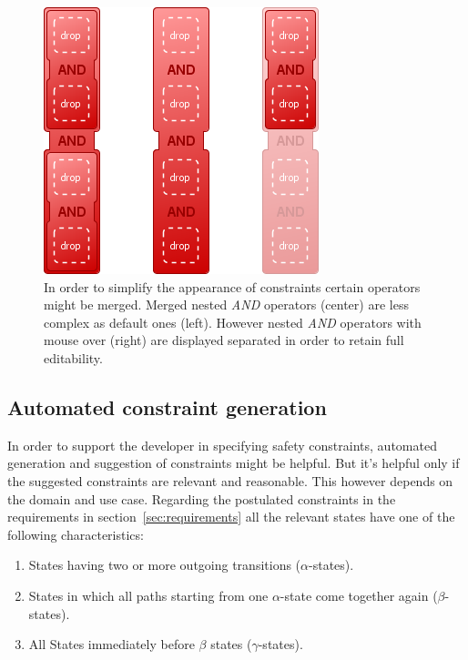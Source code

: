 \documentclass[conference]{IEEEtran}
\begin{document}
\begin{figure}[htbp]
  \centering
  \includegraphics[scale=0.5]{and_simplify} %
  \caption{In order to simplify the appearance of constraints certain operators might be merged. Merged nested \emph{AND} operators (center) are less complex as default ones (left). However nested \emph{AND} operators with mouse over (right) are displayed separated in order to retain full editability.}
  \label{fig:nested_and}
\end{figure}









\subsection{Automated constraint generation}
\label{sec:automatedconstraintgeneration}

In order to support the developer in specifying safety constraints, automated generation and suggestion of constraints might be helpful. But it's helpful only if the suggested constraints are relevant and reasonable. This however depends on the domain and use case.
Regarding the postulated constraints in the requirements in section~\ref{sec:requirements} all the relevant states have one of the following characteristics:

\begin{enumerate}
	\item States having two or more outgoing transitions ($\alpha$-states).
	\item States in which all paths starting from one $\alpha$-state come together again ($\beta$-states).
	\item All States immediately before $\beta$ states ($\gamma$-states).
\end{enumerate}
\end{document}
